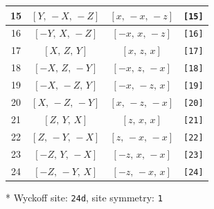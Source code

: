 \documentclass[fleqn,8pt]{jsarticle}
\begin{document}
\begin{longtable}{cccc}
15 & $\left[ Y,\, - X,\, - Z \right]$ & $\left[ x,\, - x,\, - z \right]$ & {\tt [15]} \\ \hline
16 & $\left[ - Y,\, X,\, - Z \right]$ & $\left[ - x,\, x,\, - z \right]$ & {\tt [16]} \\ \hline
17 & $\left[ X,\, Z,\, Y \right]$ & $\left[ x,\, z,\, x \right]$ & {\tt [17]} \\ \hline
18 & $\left[ - X,\, Z,\, - Y \right]$ & $\left[ - x,\, z,\, - x \right]$ & {\tt [18]} \\ \hline
19 & $\left[ - X,\, - Z,\, Y \right]$ & $\left[ - x,\, - z,\, x \right]$ & {\tt [19]} \\ \hline
20 & $\left[ X,\, - Z,\, - Y \right]$ & $\left[ x,\, - z,\, - x \right]$ & {\tt [20]} \\ \hline
21 & $\left[ Z,\, Y,\, X \right]$ & $\left[ z,\, x,\, x \right]$ & {\tt [21]} \\ \hline
22 & $\left[ Z,\, - Y,\, - X \right]$ & $\left[ z,\, - x,\, - x \right]$ & {\tt [22]} \\ \hline
23 & $\left[ - Z,\, Y,\, - X \right]$ & $\left[ - z,\, x,\, - x \right]$ & {\tt [23]} \\ \hline
24 & $\left[ - Z,\, - Y,\, X \right]$ & $\left[ - z,\, - x,\, x \right]$ & {\tt [24]} \\
\end{longtable}
* Wyckoff site: {\tt 24d}, site symmetry: {\tt 1}
\renewcommand{\arraystretch}{1.2}
\end{document}
